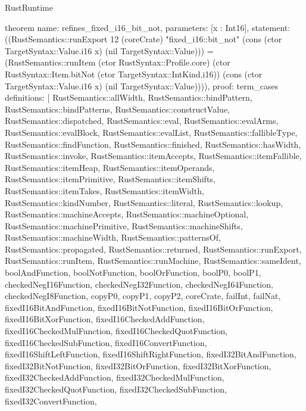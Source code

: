 \begin{lexlean}{RustRuntime}
\begin{semanticmodule}
theorem{
  name: refines_fixed_i16_bit_not,
  parameters: [x : Int16],
  statement: ((RustSemantics::runExport 12 (coreCrate) "fixed_i16::bit_not" (cons (ctor TargetSyntax::Value.i16 x) (nil TargetSyntax::Value))) = (RustSemantics::runItem (ctor RustSyntax::Profile.core) (ctor RustSyntax::Item.bitNot (ctor TargetSyntax::IntKind.i16)) (cons (ctor TargetSyntax::Value.i16 x) (nil TargetSyntax::Value)))),
  proof: term_cases{
    definitions: [
      RustSemantics::allWidth,
      RustSemantics::bindPattern,
      RustSemantics::bindPatterns,
      RustSemantics::constructValue,
      RustSemantics::dispatched,
      RustSemantics::eval,
      RustSemantics::evalArms,
      RustSemantics::evalBlock,
      RustSemantics::evalList,
      RustSemantics::fallibleType,
      RustSemantics::findFunction,
      RustSemantics::finished,
      RustSemantics::hasWidth,
      RustSemantics::invoke,
      RustSemantics::itemAccepts,
      RustSemantics::itemFallible,
      RustSemantics::itemHeap,
      RustSemantics::itemOperands,
      RustSemantics::itemPrimitive,
      RustSemantics::itemShifts,
      RustSemantics::itemTakes,
      RustSemantics::itemWidth,
      RustSemantics::kindNumber,
      RustSemantics::literal,
      RustSemantics::lookup,
      RustSemantics::machineAccepts,
      RustSemantics::machineOptional,
      RustSemantics::machinePrimitive,
      RustSemantics::machineShifts,
      RustSemantics::machineWidth,
      RustSemantics::patternsOf,
      RustSemantics::propagated,
      RustSemantics::returned,
      RustSemantics::runExport,
      RustSemantics::runItem,
      RustSemantics::runMachine,
      RustSemantics::sameIdent,
      boolAndFunction,
      boolNotFunction,
      boolOrFunction,
      boolP0,
      boolP1,
      checkedNegI16Function,
      checkedNegI32Function,
      checkedNegI64Function,
      checkedNegI8Function,
      copyP0,
      copyP1,
      copyP2,
      coreCrate,
      failInt,
      failNat,
      fixedI16BitAndFunction,
      fixedI16BitNotFunction,
      fixedI16BitOrFunction,
      fixedI16BitXorFunction,
      fixedI16CheckedAddFunction,
      fixedI16CheckedMulFunction,
      fixedI16CheckedQuotFunction,
      fixedI16CheckedSubFunction,
      fixedI16ConvertFunction,
      fixedI16ShiftLeftFunction,
      fixedI16ShiftRightFunction,
      fixedI32BitAndFunction,
      fixedI32BitNotFunction,
      fixedI32BitOrFunction,
      fixedI32BitXorFunction,
      fixedI32CheckedAddFunction,
      fixedI32CheckedMulFunction,
      fixedI32CheckedQuotFunction,
      fixedI32CheckedSubFunction,
      fixedI32ConvertFunction,
}}
\end{semanticmodule}
\end{lexlean}
